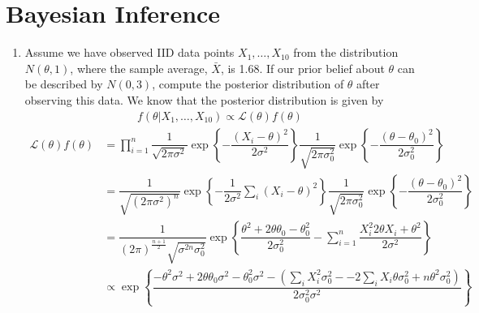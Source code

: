 \documentclass{article}
\begin{document}
\section{Bayesian Inference}
\begin{enumerate}[label={(\alph*)}]
    \item Assume we have observed IID data points $X_1,\ldots,X_{10}$ from the distribution
    $N(\theta,1)$, where the sample average, $\bar{X}$, is 1.68. If our prior
    belief about $\theta$ can be described by $N(0,3)$, compute the posterior distribution
    of $\theta$ after observing this data.
    We know that the posterior distribution is given by
    \begin{align*}
        f(\theta|X_1,\ldots,X_{10}) \propto \mathcal{L}(\theta)f(\theta)
    \end{align*}
    \begin{align*}
        \mathcal{L}(\theta)f(\theta) &= \prod_{i=1}^{n} \dfrac{1}{\sqrt{2\pi\sigma^2}}
        \exp{\left\{-\dfrac{(X_i - \theta)^2}{2\sigma^2}\right\}}
        \dfrac{1}{\sqrt{2\pi\sigma_0^2}} \exp{\left\{ - \dfrac{(\theta -
        \theta_0)^2}{2\sigma_0^2}\right\}} \\
        &= \dfrac{1}{\sqrt{(2\pi\sigma^2)^n}}\exp{\left\{-\dfrac{1}{2\sigma^2}
        \sum_i{\left(X_i - \theta \right)^2} \right\}}
        \dfrac{1}{\sqrt{2\pi\sigma_0^2}} \exp{\left\{ - \dfrac{(\theta -
        \theta_0)^2}{2\sigma_0^2}\right\}} \\
        &= \dfrac{1}{(2\pi)^\frac{n+1}{2} \sqrt{\sigma^{2n} \sigma_0^2}}
        \exp{\left\{ \dfrac{\theta^2 + 2\theta \theta_0 - \theta_0^2}{2\sigma_0^2}
        -\sum_{i=1}^n \dfrac{X_i^2 2\theta X_i + \theta^2}{2\sigma^2}\right\}} \\
        &\propto \exp{\left\{ \dfrac{-\theta^2\sigma^2 + 2\theta\theta_0\sigma^2
        - \theta_0^2\sigma^2 - (\sum_i X_i^2\sigma_0^2 - -2\sum_i X_i\theta\sigma_0^2 + 
        n\theta^2\sigma_0^2)}{2\sigma_0^2\sigma^2}\right\}} \\ 

\end{align*}
\end{enumerate}
\end{document}
